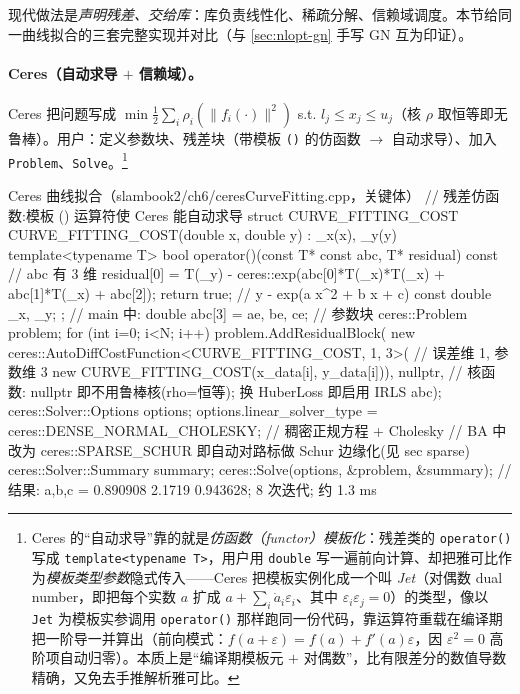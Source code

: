 现代做法是\emph{声明残差、交给库}：库负责线性化、稀疏分解、信赖域调度。本节给同一曲线拟合的三套完整实现并对比（与 \cref{sec:nlopt-gn} 手写 GN 互为印证）。

\paragraph{Ceres（自动求导 $+$ 信赖域）。}\cite{gaoxiang2019slam14}
Ceres 把问题写成 $\min\tfrac12\sum_i\rho_i(\|f_i(\cdot)\|^2)$ s.t. $l_j\le x_j\le u_j$（核 $\rho$ 取恒等即无鲁棒）。用户：定义参数块、残差块（带模板 \texttt{()} 的仿函数 $\to$ 自动求导）、加入 \texttt{Problem}、\texttt{Solve}。\footnote{Ceres 的“自动求导”靠的就是\emph{仿函数（functor）模板化}：残差类的 \texttt{operator()} 写成 \texttt{template<typename T>}，用户用 \texttt{double} 写一遍前向计算、却把雅可比作为\emph{模板类型参数}隐式传入——Ceres 把模板实例化成一个叫 \emph{Jet}（对偶数 dual number，即把每个实数 $a$ 扩成 $a+\sum_i\dot a_i\varepsilon_i$、其中 $\varepsilon_i\varepsilon_j=0$）的类型，像以 \texttt{Jet} 为模板实参调用 \texttt{operator()} 那样跑同一份代码，靠运算符重载在编译期把一阶导一并算出（前向模式：$f(a+\varepsilon)=f(a)+f'(a)\varepsilon$，因 $\varepsilon^2=0$ 高阶项自动归零）\cite{gaoxiang2019slam14,agarwal2012ceres}。本质上是“编译期模板元 $+$ 对偶数”，比有限差分的数值导数精确，又免去手推解析雅可比。}

\begin{codebox}[C++]{Ceres 曲线拟合（slambook2/ch6/ceresCurveFitting.cpp，关键体）}
// 残差仿函数:模板 () 运算符使 Ceres 能自动求导
struct CURVE_FITTING_COST {
  CURVE_FITTING_COST(double x, double y) : _x(x), _y(y) {}
  template<typename T>
  bool operator()(const T* const abc, T* residual) const {  // abc 有 3 维
    residual[0] = T(_y) - ceres::exp(abc[0]*T(_x)*T(_x) + abc[1]*T(_x) + abc[2]);
    return true;                                             // y - exp(a x^2 + b x + c)
  }
  const double _x, _y;
};
// main 中:
double abc[3] = {ae, be, ce};                               // 参数块
ceres::Problem problem;
for (int i=0; i<N; i++)
  problem.AddResidualBlock(
    new ceres::AutoDiffCostFunction<CURVE_FITTING_COST, 1, 3>(  // 误差维 1, 参数维 3
      new CURVE_FITTING_COST(x_data[i], y_data[i])),
    nullptr,    // 核函数: nullptr 即不用鲁棒核(rho=恒等); 换 HuberLoss 即启用 IRLS
    abc);
ceres::Solver::Options options;
options.linear_solver_type = ceres::DENSE_NORMAL_CHOLESKY;  // 稠密正规方程 + Cholesky
// BA 中改为 ceres::SPARSE_SCHUR 即自动对路标做 Schur 边缘化(见 sec sparse)
ceres::Solver::Summary summary;
ceres::Solve(options, &problem, &summary);
// 结果: a,b,c = 0.890908 2.1719 0.943628; 8 次迭代; 约 1.3 ms
\end{codebox}

